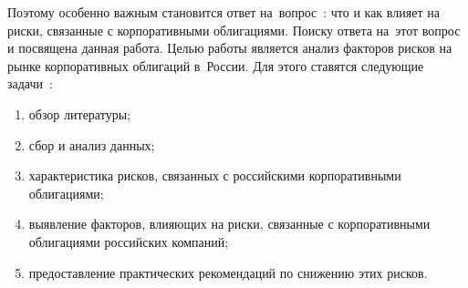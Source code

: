 Поэтому особенно важным становится ответ на~вопрос~: что и как влияет на риски, связанные с корпоративными облигациями. Поиску ответа на~этот вопрос и посвящена данная работа.
Целью работы является анализ факторов рисков на рынке корпоративных облигаций в~России. Для этого ставятся следующие задачи~:
\begin{enumerate}
	\item обзор литературы;
	\item сбор и анализ данных;
	\item характеристика рисков, связанных с российскими корпоративными облигациями;
	\item выявление факторов, влияющих на риски, связанные с корпоративными облигациями российских компаний;
	\item предоставление практических рекомендаций по снижению этих рисков.
\end{enumerate}
